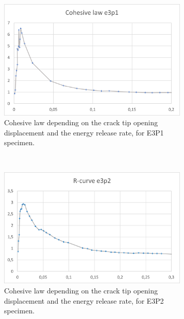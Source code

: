 \begin{figure}[H]
\centering
\begin{subfigure}{0.48\linewidth}
	\centering
	\includegraphics[scale=0.6]{Figures/e3p1_colaw}
	\decoRule
	\caption[Cohesive law from E3P1 specimen]{Cohesive law depending on the crack tip opening displacement and the energy release rate, for E3P1 specimen.}
	\label{fig:E3P1_colaw}
\end{subfigure}
\hfill\\
\begin{subfigure}{0.48\linewidth}
	\centering
	\includegraphics[scale=0.6]{Figures/e3p2_colaw}
	\decoRule
	\caption[Cohesive law from E3P2 specimen]{Cohesive law depending on the crack tip opening displacement and the energy release rate, for E3P2 specimen.}
	\label{fig:E3P2_colaw}
\end{subfigure}
\hfill\\
\begin{subfigure}{0.48\linewidth}
	\centering

\end{subfigure}
\end{figure}

